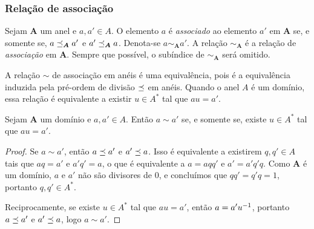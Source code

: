 
\subsubsection{Relação de associação}

\begin{definition}
Sejam $\bm A$ um anel e $a,a' \in A$. O elemento $a$ é \emph{associado} ao elemento $a'$ em $\bm A$ se, e somente se, $a \preceq_{\bm A} a'$ e $a' \preceq_{\bm A} a$. Denota-se $a \sim_{\bm A} a'$. A relação $\sim_{\bm A}$ é a relação de \emph{associação} em $\bm A$. Sempre que possível, o subíndice de $\sim_{\bm A}$ será omitido.
\end{definition}

A relação $\sim$ de associação em anéis é uma equivalência, pois é a equivalência induzida pela pré-ordem de divisão $\preceq$ em anéis. Quando o anel $A$ é um domínio, essa relação é equivalente a existir $u \in A^*$ tal que $au=a'$.

\begin{proposition}
Sejam $\bm A$ um domínio e $a,a' \in A$. Então $a \sim a'$ se, e somente se, existe $u \in A^*$ tal que $au=a'$.
\end{proposition}
\begin{proof}
Se $a \sim a'$, então $a \preceq a'$ e $a' \preceq a$. Isso é equivalente a existirem $q,q' \in A$ tais que $aq=a'$ e $a'q'=a$, o que é equivalente a $a=aqq'$ e $a'=a'q'q$.
Como $\bm A$ é um domínio, $a$ e $a'$ não são divisores de $0$, e concluímos que $qq'=q'q=1$, portanto $q,q' \in A^*$.

Reciprocamente, se existe $u \in A^*$ tal que $au=a'$, então $a=a'u^{-1}$, portanto $a \preceq a'$ e $a' \preceq a$, logo $a \sim a'$.
\end{proof}


